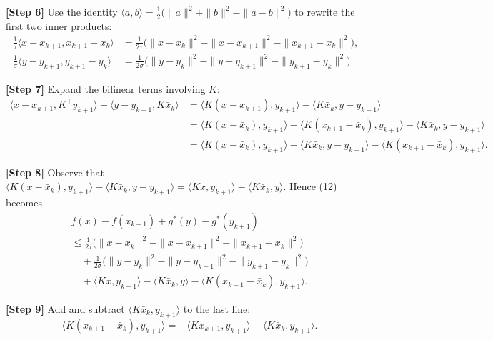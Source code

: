 \documentclass{article}
\begin{document}
\noindent\textbf{[Step 6]} Use the identity  
$\langle a,b\rangle=\frac{1}{2}\bigl(\|a\|^{2}+\|b\|^{2}-\|a-b\|^{2}\bigr)$
to rewrite the first two inner products:
\[
\begin{aligned}
\frac{1}{\tau}\langle x-x_{k+1},x_{k+1}-x_{k}\rangle
&=\frac{1}{2\tau}\bigl(\|x-x_{k}\|^{2}-\|x-x_{k+1}\|^{2}
                     -\|x_{k+1}-x_{k}\|^{2}\bigr),\\[1mm]
\frac{1}{\sigma}\langle y-y_{k+1},y_{k+1}-y_{k}\rangle
&=\frac{1}{2\sigma}\bigl(\|y-y_{k}\|^{2}-\|y-y_{k+1}\|^{2}
                     -\|y_{k+1}-y_{k}\|^{2}\bigr).
\end{aligned}
\tag{13}
\]

\noindent\textbf{[Step 7]} Expand the bilinear terms involving $K$:
\[
\begin{aligned}
\langle x-x_{k+1},K^{\!\top}y_{k+1}\rangle
   -\langle y-y_{k+1},K\bar{x}_{k}\rangle
&= \langle K(x-x_{k+1}),y_{k+1}\rangle
   -\langle K\bar{x}_{k},y-y_{k+1}\rangle\\
&= \langle K(x-\bar{x}_{k}),y_{k+1}\rangle
   -\langle K(x_{k+1}-\bar{x}_{k}),y_{k+1}\rangle
   -\langle K\bar{x}_{k},y-y_{k+1}\rangle\\
&= \langle K(x-\bar{x}_{k}),y_{k+1}\rangle
   -\langle K\bar{x}_{k},y-y_{k+1}\rangle
   -\langle K(x_{k+1}-\bar{x}_{k}),y_{k+1}\rangle .
\end{aligned}
\tag{14}
\]

\noindent\textbf{[Step 8]} Observe that  
$\langle K(x-\bar{x}_{k}),y_{k+1}\rangle-\langle K\bar{x}_{k},y-y_{k+1}\rangle
   =\langle Kx,y_{k+1}\rangle-\langle K\bar{x}_{k},y\rangle$.
Hence (12) becomes
\[
\begin{aligned}
&f(x)-f(x_{k+1})+g^{*}(y)-g^{*}(y_{k+1})\\
&\le
\frac{1}{2\tau}\bigl(\|x-x_{k}\|^{2}-\|x-x_{k+1}\|^{2}
                     -\|x_{k+1}-x_{k}\|^{2}\bigr)\\
&\quad+
\frac{1}{2\sigma}\bigl(\|y-y_{k}\|^{2}-\|y-y_{k+1}\|^{2}
                     -\|y_{k+1}-y_{k}\|^{2}\bigr)\\
&\quad+\langle Kx,y_{k+1}\rangle-\langle K\bar{x}_{k},y\rangle
 -\langle K(x_{k+1}-\bar{x}_{k}),y_{k+1}\rangle .
\end{aligned}
\tag{15}
\]

\noindent\textbf{[Step 9]} Add and subtract $\langle K\bar{x}_{k},y_{k+1}\rangle$ to the last line:
\[
-\langle K(x_{k+1}-\bar{x}_{k}),y_{k+1}\rangle
 =-\langle Kx_{k+1},y_{k+1}\rangle+\langle K\bar{x}_{k},y_{k+1}\rangle .
\tag{16}
\]
\end{document}
